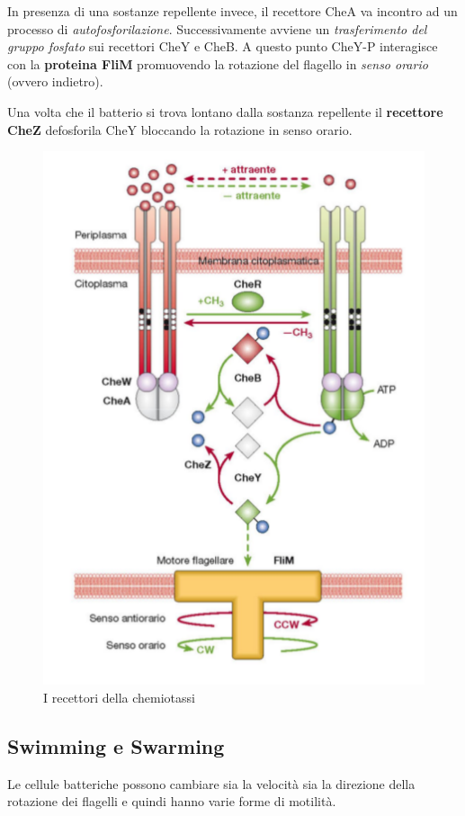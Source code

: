 \documentclass[11pt]{book}
\begin{document}
\vspace{1em}
In presenza di una sostanze repellente invece, il recettore CheA va incontro ad un processo di \emph{autofosforilazione}. Successivamente avviene un \emph{trasferimento del gruppo fosfato} sui recettori CheY e CheB. A questo punto CheY-P interagisce con la \textbf{proteina FliM} promuovendo la rotazione del flagello in \emph{senso orario} (ovvero indietro).

Una volta che il batterio si trova lontano dalla sostanza repellente il \textbf{recettore CheZ} defosforila CheY bloccando la rotazione in senso orario.

\clearpage
\begin{figure}[htp]
\centering
\includegraphics[scale=0.5]{img/Recettori chemiotassi.png}
\caption{I recettori della chemiotassi}
\label{}
\end{figure}

\subsection{Swimming e Swarming}

Le cellule batteriche possono cambiare sia la velocità sia la direzione della rotazione dei flagelli e quindi hanno varie forme di motilità.
\end{document}
